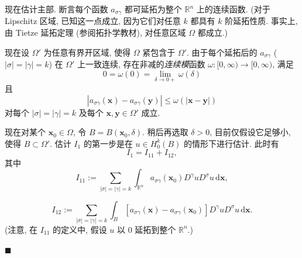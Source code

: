 \begingroup
\renewenvironment{Proof}{\par}{\par\nobreak\hfill$\blacksquare$\par\vspace{0.1cm}}
\begin{Proof}
现在估计主部. 断言每个函数 $a_{\sigma\gamma}$ 都可延拓为整个 $\mathbb{R}^n$ 上的连续函数. (对于 Lipschitz 区域, 已知这一点成立, 因为它们对任意 $k$ 都具有 $k$ 阶延拓性质. 事实上, 由 Tietze 延拓定理 (参阅拓扑学教材), 对任意区域 $\Omega$ 都成立.)

现在设 $\Omega\prime$ 为任意有界开区域, 使得 $\Omega$ 紧包含于 $\Omega\prime$. 由于每个延拓后的 $a_{\sigma\gamma}$ ($|\sigma|=|\gamma|=k$) 在 $\Omega\prime$ 上一致连续, 存在非减的\emph{连续模}函数 $\omega:[0,\infty)\to[0,\infty)$, 满足
\begin{equation}\label{eq:garding-common-continuity-modulus-at-zero}
0=\omega(0)=\lim_{\delta\to0+}\omega(\delta)
\end{equation}
且
\begin{equation}\label{eq:garding-common-coefficient-continuity-modulus}
|a_{\sigma\gamma}(\bm{x})-a_{\sigma\gamma}(\bm{y})|\leq\omega(|\bm{x}-\bm{y}|)
\end{equation}
对每个 $|\sigma|=|\gamma|=k$ 及每个 $\bm{x},\bm{y}\in\Omega\prime$ 成立.

现在对某个 $\bm{x}_0\in\Omega$, 令 $B=B(\bm{x}_0,\delta)$. 稍后再选取 $\delta>0$, 目前仅假设它足够小, 使得 $B\subset\Omega\prime$. 估计 $I_1$ 的第一步是在 $u\in H_0^k(B)$ 的情形下进行估计. 此时有
\begin{equation}\label{eq:garding-frozen-principal-coefficient-splitting}
I_1=I_{11}+I_{12},
\end{equation}
其中
\begin{equation}\label{eq:garding-frozen-principal-part}
I_{11}:=\sum_{|\sigma|=|\gamma|=k}\int_{\mathbb{R}^n}a_{\sigma\gamma}(\bm{x}_0)D^\gamma uD^\sigma u\,\mathrm{d}\bm{x},
\end{equation}

\begin{equation}\label{eq:garding-coefficient-variation-part}
I_{12}:=\sum_{|\sigma|=|\gamma|=k}\int_B[a_{\sigma\gamma}(\bm{x})-a_{\sigma\gamma}(\bm{x}_0)]D^\gamma uD^\sigma u\,\mathrm{d}\bm{x}.
\end{equation}
(注意, 在 $I_{11}$ 的定义中, 假设 $u$ 以 $0$ 延拓到整个 $\mathbb{R}^n$.)


\end{Proof}
